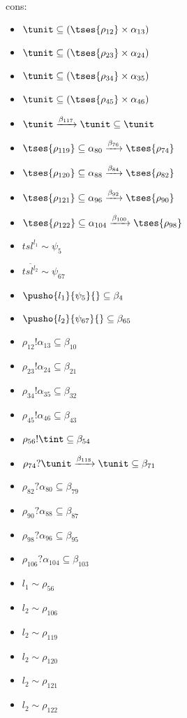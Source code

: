 \documentclass[12pt]{article}
\begin{document}
\\  cons: \begin{itemize}
\item $ \tunit \subseteq ( \tses{ \rho_{12}} \times \alpha_{13}) $
\item $ \tunit \subseteq ( \tses{ \rho_{23}} \times \alpha_{24}) $
\item $ \tunit \subseteq ( \tses{ \rho_{34}} \times \alpha_{35}) $
\item $ \tunit \subseteq ( \tses{ \rho_{45}} \times \alpha_{46}) $
\item $ \tunit \xrightarrow{\beta_{117}} \tunit \subseteq \tunit $
\item $  \tses{ \rho_{119}} \subseteq \alpha_{80} \xrightarrow{\beta_{76}}  \tses{ \rho_{74}} $
\item $  \tses{ \rho_{120}} \subseteq \alpha_{88} \xrightarrow{\beta_{84}}  \tses{ \rho_{82}} $
\item $  \tses{ \rho_{121}} \subseteq \alpha_{96} \xrightarrow{\beta_{92}}  \tses{ \rho_{90}} $
\item $  \tses{ \rho_{122}} \subseteq \alpha_{104} \xrightarrow{\beta_{100}}  \tses{ \rho_{98}} $
\item $ {tsl}^{l_{1}} \sim\psi_{5} $
\item $ \overline{{tsl}^{l_{2}}} \sim\psi_{67} $
\item $ \pusho{ l_{1}} {\psi_{5}}{} \subseteq \beta_{4} $
\item $ \pusho{ l_{2}} {\psi_{67}}{} \subseteq \beta_{65} $
\item $ \rho_{12}!\alpha_{13} \subseteq \beta_{10} $
\item $ \rho_{23}!\alpha_{24} \subseteq \beta_{21} $
\item $ \rho_{34}!\alpha_{35} \subseteq \beta_{32} $
\item $ \rho_{45}!\alpha_{46} \subseteq \beta_{43} $
\item $ \rho_{56}!\tint \subseteq \beta_{54} $
\item $ \rho_{74}?\tunit \xrightarrow{\beta_{118}} \tunit \subseteq \beta_{71} $
\item $ \rho_{82}?\alpha_{80} \subseteq \beta_{79} $
\item $ \rho_{90}?\alpha_{88} \subseteq \beta_{87} $
\item $ \rho_{98}?\alpha_{96} \subseteq \beta_{95} $
\item $ \rho_{106}?\alpha_{104} \subseteq \beta_{103} $
\item $ l_{1} \sim\rho_{56} $
\item $ l_{2} \sim\rho_{106} $
\item $ l_{2} \sim\rho_{119} $
\item $ l_{2} \sim\rho_{120} $
\item $ l_{2} \sim\rho_{121} $
\item $ l_{2} \sim\rho_{122} $
\end{itemize} 
\end{document}
